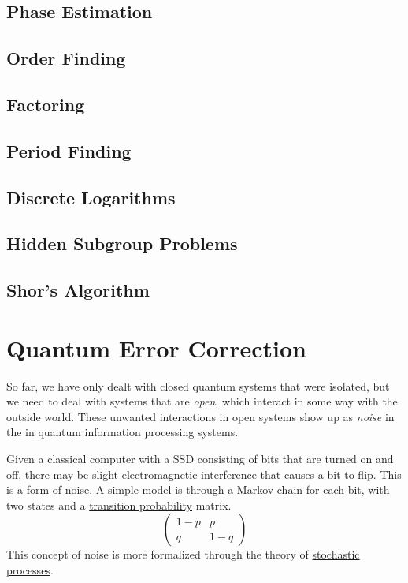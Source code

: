\documentclass{article}
\newcounter{example}[section]
\begin{document}
  \subsection{Phase Estimation}

  \subsection{Order Finding}

  \subsection{Factoring}

  \subsection{Period Finding} 

  \subsection{Discrete Logarithms}

  \subsection{Hidden Subgroup Problems}

  \subsection{Shor's Algorithm}

\section{Quantum Error Correction}

  So far, we have only dealt with closed quantum systems that were isolated, but we need to deal with systems that are \textit{open}, which interact in some way with the outside world. These unwanted interactions in open systems show up as \textit{noise} in the in quantum information processing systems. 

  \begin{example}
    \label{ex:classical-noise-in-quantum-systems}
    Given a classical computer with a SSD consisting of bits that are turned on and off, there may be slight electromagnetic interference that causes a bit to flip. This is a form of noise. A simple model is through a \hyperref[sp-def:markov-chain]{Markov chain} for each bit, with two states and a \hyperref[sp-def:transition-probability]{transition probability} matrix.  
    \begin{equation}
      \begin{pmatrix} 1 - p & p \\ q & 1 - q \end{pmatrix}
    \end{equation}
    This concept of noise is more formalized through the theory of \hyperref[sp-def:stochastic-process]{stochastic processes}. 
  \end{example}
\end{document}
